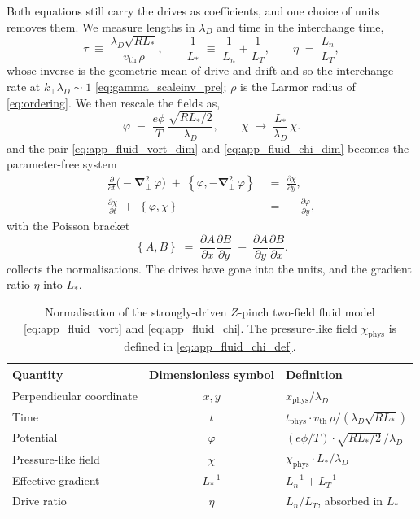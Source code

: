 \documentclass{jpp}
\renewcommand{\vec}[1]{\boldsymbol{#1}}
\newcommand{\vec}[1]{\boldsymbol{#1}}
\newcommand{\grad}{{\vec{\nabla}}}
\newcommand{\kperp}{k_\perp}
\newcommand{\vth}{v_\text{th}}
\newcommand{\pbra}[2]{\left\lbrace #1, #2 \right\rbrace}
\newcommand{\lambdaD}{\lambda_D}
\begin{document}
Both equations still carry the drives as coefficients, and one choice of units removes them. We measure lengths in $\lambdaD$ and time in the interchange time,
\begin{equation}\label{eq:app_fluid_tau}
\tau \;\equiv\; \frac{\lambdaD\sqrt{R L_*}}{\vth\,\rho} ,
\qquad
\frac{1}{L_*} \;\equiv\; \frac{1}{L_n} + \frac{1}{L_T} ,
\qquad
\eta \;=\; \frac{L_n}{L_T} ,
\end{equation}
whose inverse is the geometric mean of drive and drift and so the interchange rate at $\kperp\lambdaD \sim 1$ \cref{eq:gamma_scaleinv_pre}; $\rho$ is the Larmor radius of \cref{eq:ordering}. We then rescale the fields as,
\begin{equation}\label{eq:app_fluid_units}
\varphi \;\equiv\; \frac{e\phi}{T}\,\frac{\sqrt{R L_*/2}}{\lambdaD},
\qquad
\chi \;\to\; \frac{L_*}{\lambdaD}\,\chi .
\end{equation}
and the pair \cref{eq:app_fluid_vort_dim} and \cref{eq:app_fluid_chi_dim} becomes the parameter-free system
\begin{align}
\frac{\partial}{\partial t}\bigl(-\grad_\perp^2\,\varphi\bigr) \;+\; \pbra{\varphi}{-\grad_\perp^2\,\varphi} \;&=\; \frac{\partial \chi}{\partial y}, \label{eq:app_fluid_vort}\\
\frac{\partial \chi}{\partial t} \;+\; \pbra{\varphi}{\chi} \;&=\; -\frac{\partial \varphi}{\partial y}, \label{eq:app_fluid_chi}
\end{align}
with the Poisson bracket
\begin{equation}\label{eq:app_fluid_bracket}
\pbra{A}{B} \;=\; \frac{\partial A}{\partial x}\frac{\partial B}{\partial y} \;-\; \frac{\partial A}{\partial y}\frac{\partial B}{\partial x} .
\end{equation}
 collects the normalisations. The drives have gone into the units, and the gradient ratio $\eta$ into $L_*$.

\begin{table}
\centering
\renewcommand{\arraystretch}{1.2}
\begin{tabular}{lcl}
\hline
Quantity & Dimensionless symbol & Definition \\
\hline
Perpendicular coordinate    & $x, y$       & $x_\mathrm{phys}/\lambdaD$ \\
Time                        & $t$          & $t_\mathrm{phys}\cdot \vth\,\rho/(\lambdaD\sqrt{R L_*})$ \\
Potential                   & $\varphi$    & $(e\phi/T) \cdot \sqrt{R L_*/2}\,/\lambdaD$ \\
Pressure-like field         & $\chi$       & $\chi_\mathrm{phys}\cdot L_*/\lambdaD$ \\
\hline
Effective gradient          & $L_*^{-1}$   & $L_n^{-1} + L_T^{-1}$ \\
Drive ratio                 & $\eta$       & $L_n/L_T$, absorbed in $L_*$ \\
\hline
\end{tabular}
\caption{Normalisation of the strongly-driven $Z$-pinch two-field fluid model \cref{eq:app_fluid_vort} and \cref{eq:app_fluid_chi}. The pressure-like field $\chi_\mathrm{phys}$ is defined in \cref{eq:app_fluid_chi_def}.}
\label{tab:plunk_norms}
\end{table}
\end{document}
